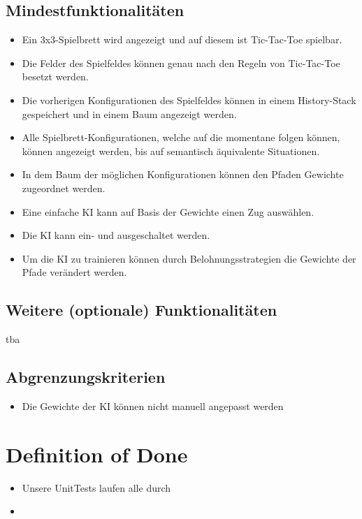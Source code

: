 \documentclass[titlepage]{scrartcl}
\begin{document}
\subsection{Mindestfunktionalitäten}
		\begin{itemize}
			\item Ein 3x3-Spielbrett wird angezeigt und auf diesem ist Tic-Tac-Toe spielbar.
			\item Die Felder des Spielfeldes können genau nach den Regeln von Tic-Tac-Toe besetzt werden.
			\item Die vorherigen Konfigurationen des Spielfeldes können in einem History-Stack gespeichert und in einem Baum angezeigt werden.
			\item Alle Spielbrett-Konfigurationen, welche auf die momentane folgen können, können angezeigt werden, bis auf semantisch äquivalente Situationen.
			\item In dem Baum der möglichen Konfigurationen können den Pfaden Gewichte zugeordnet werden.
			\item Eine einfache KI kann auf Basis der Gewichte einen Zug auswählen.
			\item Die KI kann ein- und ausgeschaltet werden.
			\item Um die KI zu trainieren können durch Belohnungsstrategien die Gewichte der Pfade verändert werden.
		\end{itemize}
\subsection{Weitere (optionale) Funktionalitäten}
	tba
\subsection{Abgrenzungskriterien}
	\begin{itemize}
		\item Die Gewichte der KI können nicht manuell angepasst werden
	\end{itemize}
\section{Definition of Done}%
\begin{itemize}
	\item Unsere UnitTests laufen alle durch
	\item 
\end{itemize}
\end{document}
